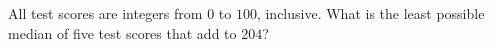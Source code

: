 All test scores are integers from $0$ to $100$, inclusive. What is the least possible median of five test scores that add to $204$?
